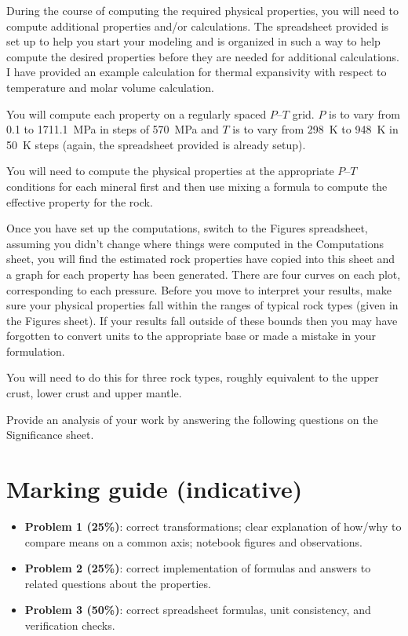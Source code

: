 \documentclass[11pt,a4paper]{article}
\begin{document}
During the course of computing the required physical properties, you will need to compute additional properties and/or calculations.  The spreadsheet provided is set up to help you start your modeling and is organized in such a way to help compute the desired properties before they are needed for additional calculations.  I have provided an example calculation for thermal expansivity with respect to temperature and molar volume calculation.

You will compute each property on a regularly spaced $P$--$T$ grid. $P$ is to vary from 0.1 to 1711.1~MPa in steps of 570~MPa and $T$ is to vary from 298~K to 948~K in 50~K steps (again, the spreadsheet provided is already setup).

You will need to compute the physical properties at the appropriate $P$--$T$ conditions for each mineral first and then use mixing a formula to compute the effective property for the rock.

Once you have set up the computations, switch to the Figures spreadsheet, assuming you didn't change where things were computed in the Computations sheet, you will find the estimated rock properties have copied into this sheet and a graph for each property has been generated.  There are four curves on each plot, corresponding to each pressure.  Before you move to interpret your results, make sure your physical properties fall within the ranges of typical rock types (given in the Figures sheet).  If your results fall outside of these bounds then you may have forgotten to convert units to the appropriate base or made a mistake in your formulation.

You will need to do this for three rock types, roughly equivalent to the upper crust, lower crust and upper mantle.

Provide an analysis of your work by answering the following questions on the Significance sheet.

\section*{Marking guide (indicative)}
\begin{itemize}[leftmargin=*]
  \item \textbf{Problem 1 (25\%)}: correct transformations; clear explanation of how/why to compare means on a common axis; notebook figures and observations.
  \item \textbf{Problem 2 (25\%)}: correct implementation of formulas and answers to related questions about the properties.
  \item \textbf{Problem 3 (50\%)}: correct spreadsheet formulas, unit consistency, and verification checks.
\end{itemize}
\end{document}
